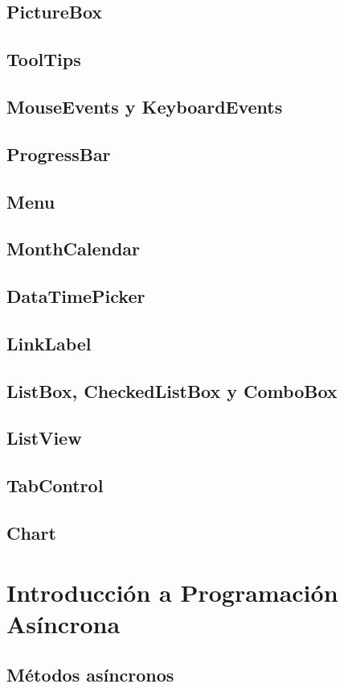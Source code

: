 \documentclass[12pt,a4paper]{report}
\begin{document}
\section{PictureBox}
\section{ToolTips}
\section{MouseEvents y KeyboardEvents}
\section{ProgressBar}
\section{Menu}
\section{MonthCalendar}
\section{DataTimePicker}
\section{LinkLabel}
\section{ListBox, CheckedListBox y ComboBox}
\section{ListView}
\section{TabControl}
\section{Chart}

\chapter{Introducción a Programación Asíncrona}
\section{Métodos asíncronos}
\end{document}
